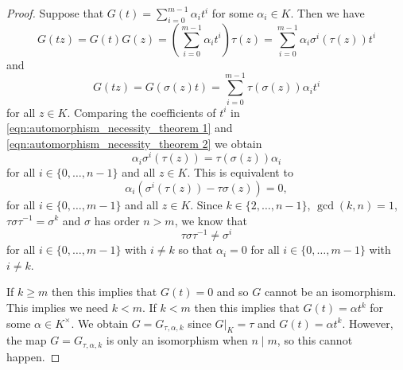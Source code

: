 \documentclass[10pt,a4paper]{amsart}
\begin{document}
 \begin{proof}
 Suppose  that $G(t) = \sum_{i=0}^{m-1} \alpha_i t^i$ for some $\alpha_i \in K$.
Then we have
\begin{equation} \label{eqn:automorphism_necessity_theorem 1}
G(tz) = G(t)G(z) = (\sum_{i=0}^{m-1} \alpha_i t^i ) \tau(z) =
\sum_{i=0}^{m-1} \alpha_i \sigma^{i}(\tau(z)) t^i \end{equation} and
\begin{equation} \label{eqn:automorphism_necessity_theorem 2}
G(tz) =
G(\sigma(z)t) = \sum_{i=0}^{m-1} \tau(\sigma(z)) \alpha_i t^i
\end{equation}
for all $z \in K$. Comparing the coefficients of $t^i$
in \eqref{eqn:automorphism_necessity_theorem 1} and
\eqref{eqn:automorphism_necessity_theorem 2} we obtain
$$\alpha_i \sigma^{i}(\tau(z)) = \tau(\sigma(z)) \alpha_i$$
for all $i \in\{ 0, \ldots, n-1\}$ and all $z \in K$. This is equivalent to
$$\alpha_i (\sigma^i(\tau(z)) - \tau\sigma(z)  )=0,$$
for all $i \in\{ 0, \ldots, m-1 \}$ and all $z \in K$.
Since $k\in \{2,\dots, n-1 \}$, $\gcd (k, n)=1$,
 $\tau \sigma\tau^{-1}=\sigma^k$
 and $\sigma$ has order $n > m$, we know that
 $$\tau \sigma\tau^{-1}\not=\sigma^i$$
 for all  $i \in\{ 0, \ldots, m-1\}$ with $i\not=k$ so that  $\alpha_i = 0$ for
all $ i \in\{ 0, \ldots, m-1\}$  with $i\not=k$.

 If  $k\geq m$ then this implies that $G(t)=0$ and so $G$ cannot be an isomorphism. This implies we need $k<m$.
If $k<m$ then this implies that $G(t) = \alpha t^k$ for some $\alpha\in K^{\times}$.
We obtain $G=G_{\tau,\alpha,k}$
since $G|_{K}=\tau$ and $G(t)=\alpha t^k$.
However, the map $G=G_{\tau,\alpha,k}$ is only an isomorphism when $n\mid m$, so this cannot happen.
\end{proof}
\end{document}
